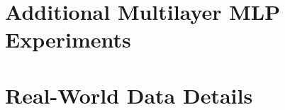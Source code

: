 \documentclass{article}
\begin{document}
%


\section{Additional Multilayer MLP Experiments}
\label{app:mlp}

%


\section{Real-World Data Details}
\label{app:real}

%
\end{document}
